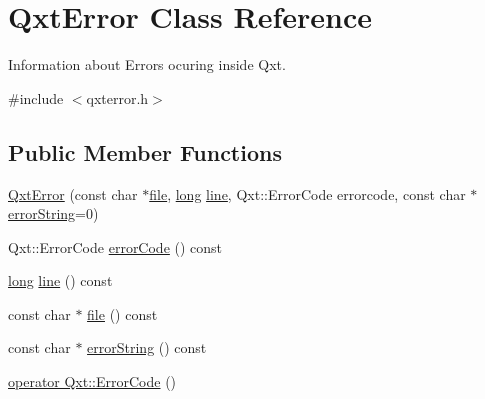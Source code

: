 \hypertarget{class_qxt_error}{\section{Qxt\-Error Class Reference}
\label{class_qxt_error}
}


Information about Errors ocuring inside Qxt.  




{\ttfamily \#include $<$qxterror.\-h$>$}

\subsection*{Public Member Functions}
\begin{DoxyCompactItemize}
\item 
\hyperlink{class_qxt_error_aad640297dbcedc6f8e2e1b3b9b557021}{Qxt\-Error} (const char $\ast$\hyperlink{class_qxt_error_a9aa5d31db2ccf3102467be7f5e41a939}{file}, \hyperlink{ioapi_8h_a3c7b35ad9dab18b8310343c201f7b27e}{long} \hyperlink{class_qxt_error_a30d639a6eb246276ab6dd774a78750fd}{line}, Qxt\-::\-Error\-Code errorcode, const char $\ast$\hyperlink{class_qxt_error_adbdaf1c7ca68c79fc7838d39806e6296}{error\-String}=0)
\item 
Qxt\-::\-Error\-Code \hyperlink{class_qxt_error_a97a79dce758176592a7f6bded97fdbb4}{error\-Code} () const 
\item 
\hyperlink{ioapi_8h_a3c7b35ad9dab18b8310343c201f7b27e}{long} \hyperlink{class_qxt_error_a30d639a6eb246276ab6dd774a78750fd}{line} () const 
\item 
const char $\ast$ \hyperlink{class_qxt_error_a9aa5d31db2ccf3102467be7f5e41a939}{file} () const 
\item 
const char $\ast$ \hyperlink{class_qxt_error_adbdaf1c7ca68c79fc7838d39806e6296}{error\-String} () const 
\item 
\hyperlink{class_qxt_error_a30748abf8104123fd84aaa92fb1a73ec}{operator Qxt\-::\-Error\-Code} ()
\end{DoxyCompactItemize}
